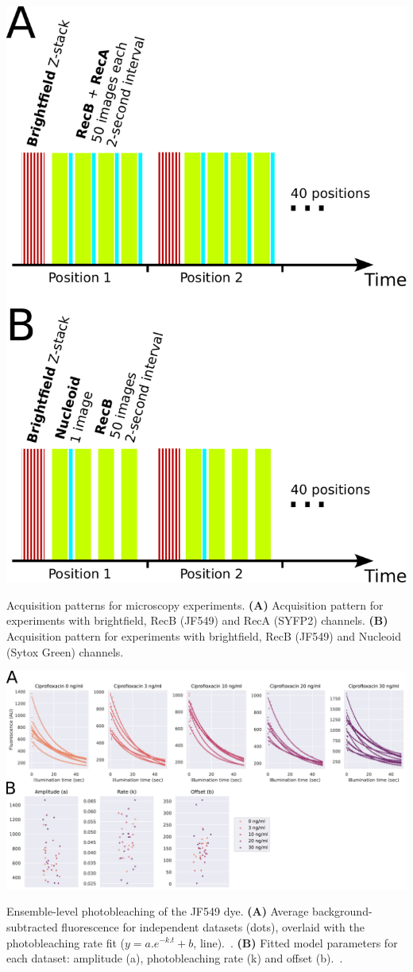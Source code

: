 \begin{suppfigure*}[htbp]
    \begin{center}
    \includegraphics[width=.5\textwidth]{SI_Figures/Acquisition_pattern.pdf}
    \end{center}
    \caption{Acquisition patterns for microscopy experiments. \textbf{(A)} Acquisition pattern for experiments with brightfield, RecB (JF549) and RecA (SYFP2) channels. \textbf{(B)} Acquisition pattern for experiments with brightfield, RecB (JF549) and Nucleoid (Sytox Green) channels.}\label{SIFig:acquisition_pattern}
\end{suppfigure*}

\begin{suppfigure*}[htbp]
    \begin{center}
        \includegraphics[width=\textwidth]{SI_Figures/SIFig_bleaching.pdf}
    \end{center}
    \caption{Ensemble-level photobleaching of the JF549 dye. \textbf{(A)} Average background-subtracted fluorescence for independent datasets (dots), overlaid with the photobleaching rate fit ($y=a.e^{-k.t}+b$, line).\ . \textbf{(B)} Fitted model parameters for each dataset: amplitude (a), photobleaching rate (k) and offset (b).\ .}\label{SIFig:dye_bleaching}
\end{suppfigure*}

